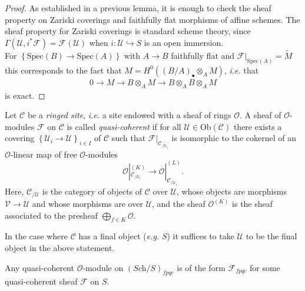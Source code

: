 \begin{proof}
As established in a previous lemma, it is enough to check the sheaf property 
on Zariski coverings and faithfully flat morphisms of affine schemes.  The 
sheaf property for Zariski coverings is standard scheme theory, since 
$\Gamma(\mathcal{U}, i^\ast \mathcal{F}) = \mathcal{F}(\mathcal{U})$ when $i: 
\mathcal{U} \hookrightarrow S$ is an open immersion. 
  \\
  For $\left\{\text{Spec}(B)\to \text{Spec}(A)\right\}$ with $A\to B$ faithfully
  flat and 
  $\mathcal{F}|_{\text{Spec}(A)} = \widetilde{M}$ 
  this corresponds to the fact that
  $M=H^0\left((B/A)_\bullet\otimes_AM \right)$, {\it i.e.} that
  \begin{align*}
0 \to M \to B\otimes_A M \to B\otimes_A B \otimes_A M
\end{align*}
is exact.
\end{proof}

\begin{definition}
Let $\mathcal{C}$ be a \emph{ringed site}, {\it i.e.} a site endowed with a 
sheaf of rings $\mathcal{O}$. A sheaf of $\mathcal{O}$-modules $\mathcal{F}$ on 
$\mathcal{C}$ is called \emph{quasi-coherent} if for all $\mathcal{U}\in 
\text{Ob}(\mathcal{C})$ there exists a covering $\left\{\mathcal{U}_i \to 
\mathcal{U}\right\}_{i\in I}$ of $\mathcal{C}$ such that  
$\mathcal{F}|_{\mathcal{C}_{/\mathcal{U}_i}}$ is isomorphic to the cokernel of 
an $\mathcal{O}$-linear map of free $\mathcal{O}$-modules 
$$\mathcal{O}|_{\mathcal{C}_{/\mathcal{U}_i}}^{(K)} \to 
\mathcal{O}|_{\mathcal{C}_{/\mathcal{U}_i}}^{(L)}.$$ Here, 
$\mathcal{C}_{/\mathcal{U}}$ is the category of objects of $\mathcal{C}$ over 
$\mathcal{U}$, whose objects are morphisms $\mathcal{V} \to \mathcal{U}$ and 
whose morphisms are over $\mathcal{U}$, and the sheaf $\mathcal{O}^{(K)}$ is 
the sheaf associated to the presheaf $\bigoplus_{f \in K} \mathcal{O}$. 
\end{definition}
  
\begin{remark}
In the case where $\mathcal{C}$ has a final object ({\it e.g.} $S$) it 
suffices to take $\mathcal{U}$ to be the final object in the above statement.
\end{remark}

\begin{theorem}
Any quasi-coherent $\mathcal{O}$-module on $(\textit{Sch}/S)_{fpqc}$ is of the form 
$\mathcal{F}_{fpqc}$ for some quasi-coherent sheaf $\mathcal{F}$ on $S$. 
\end{theorem}

